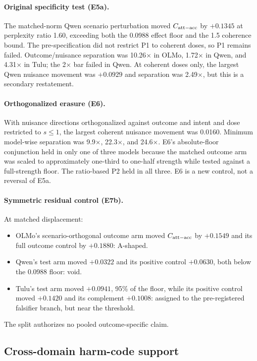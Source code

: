 \paragraph{Original specificity test (E5a).}
The matched-norm Qwen scenario perturbation moved $C_{\mathrm{att-acc}}$ by $+0.1345$ at perplexity ratio 1.60, exceeding both the 0.0988 effect floor and the 1.5 coherence bound.
The pre-specification did not restrict P1 to coherent doses, so P1 remains failed.
Outcome/nuisance separation was 10.26$\times$ in OLMo, 1.72$\times$ in Qwen, and 4.31$\times$ in Tulu; the 2$\times$ bar failed in Qwen.
At coherent doses only, the largest Qwen nuisance movement was $+0.0929$ and separation was 2.49$\times$, but this is a secondary restatement.

\paragraph{Orthogonalized erasure (E6).}
With nuisance directions orthogonalized against outcome and intent and dose restricted to $s\leq1$, the largest coherent nuisance movement was 0.0160.
Minimum model-wise separation was 9.9$\times$, 22.3$\times$, and 24.6$\times$.
E6's absolute-floor conjunction held in only one of three models because the matched outcome arm was scaled to approximately one-third to one-half strength while tested against a full-strength floor.
The ratio-based P2 held in all three.
E6 is a new control, not a reversal of E5a.

\paragraph{Symmetric residual control (E7b).}
At matched displacement:
\begin{itemize}[leftmargin=*]
    \item OLMo's scenario-orthogonal outcome arm moved $C_{\mathrm{att-acc}}$ by $+0.1549$ and its full outcome control by $+0.1880$: A-shaped.
    \item Qwen's test arm moved $+0.0322$ and its positive control $+0.0630$, both below the 0.0988 floor: void.
    \item Tulu's test arm moved $+0.0941$, 95\% of the floor, while its positive control moved $+0.1420$ and its complement $+0.1008$: assigned to the pre-registered falsifier branch, but near the threshold.
\end{itemize}
The split authorizes no pooled outcome-specific claim.

\subsection{Cross-domain harm-code support}

